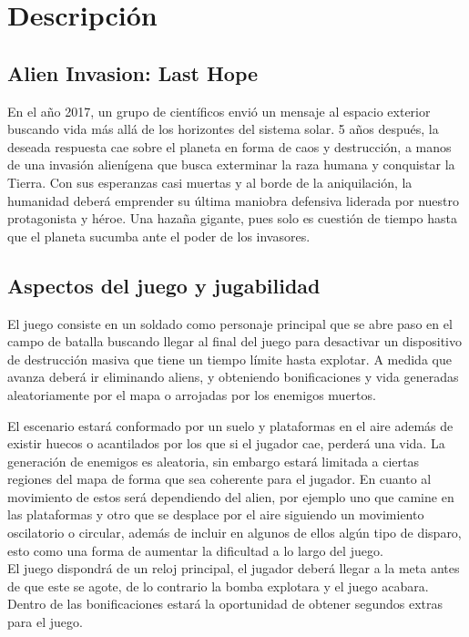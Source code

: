 \documentclass{article}
\begin{document}
\section{Descripción}
\subsection{Alien Invasion: Last Hope}

En el año 2017, un grupo de científicos envió un mensaje al espacio exterior buscando vida más allá de los horizontes del sistema solar. 5 años después, la deseada respuesta cae sobre el planeta en forma de caos y destrucción, a manos de una invasión alienígena que busca exterminar la raza humana y conquistar la Tierra. Con sus esperanzas casi muertas y al borde de la aniquilación, la humanidad deberá emprender su última maniobra defensiva liderada por nuestro protagonista y héroe. Una hazaña gigante, pues solo es cuestión de tiempo hasta que el planeta sucumba ante el poder de los invasores.

\subsection{Aspectos del juego y jugabilidad}
El juego consiste en un soldado como personaje principal que se abre paso en el campo de batalla buscando llegar al final del juego para desactivar un dispositivo de destrucción masiva que tiene un tiempo límite hasta explotar. A medida que avanza deberá ir eliminando aliens, y obteniendo bonificaciones y vida generadas aleatoriamente por el mapa o arrojadas por los enemigos muertos. 

El escenario estará conformado por un suelo y plataformas en el aire además de existir huecos o acantilados por los que si el jugador cae, perderá una vida. La generación de enemigos es aleatoria, sin embargo estará limitada a ciertas regiones del mapa de forma que sea coherente para el jugador. En cuanto al movimiento de estos será dependiendo del alien, por ejemplo uno que camine en las plataformas y otro que se desplace por el aire siguiendo un movimiento oscilatorio o circular, además de incluir en algunos de ellos algún tipo de disparo, esto como una forma de aumentar la dificultad a lo largo del juego.\\

El juego dispondrá de un reloj principal, el jugador deberá llegar a la meta antes de que este se agote, de lo contrario la bomba explotara y el juego acabara. Dentro de las bonificaciones estará la oportunidad de obtener segundos extras para el juego.\\ 
\end{document}
